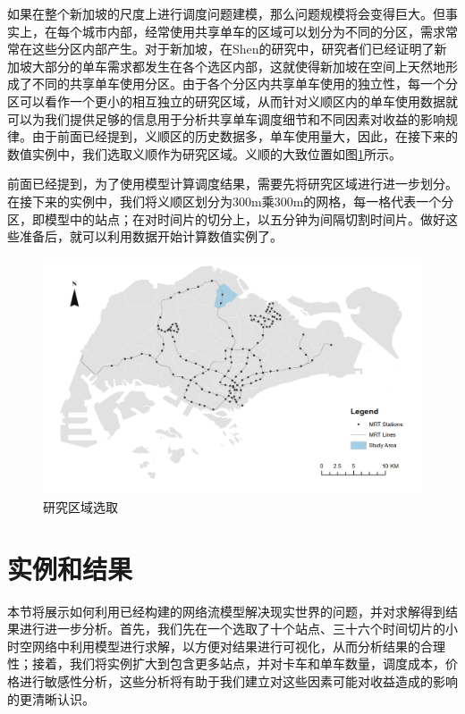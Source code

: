 \documentclass[]{tongjithesis}
\numberwithin{equation}{chapter}
\begin{document}
如果在整个新加坡的尺度上进行调度问题建模，那么问题规模将会变得巨大。但事实上，在每个城市内部，经常使用共享单车的区域可以划分为不同的分区，需求常常在这些分区内部产生。对于新加坡，在Shen\cite{shen2018mobility}的研究中，研究者们已经证明了新加坡大部分的单车需求都发生在各个选区内部，这就使得新加坡在空间上天然地形成了不同的共享单车使用分区。由于各个分区内共享单车使用的独立性，每一个分区可以看作一个更小的相互独立的研究区域，从而针对义顺区内的单车使用数据就可以为我们提供足够的信息用于分析共享单车调度细节和不同因素对收益的影响规律。由于前面已经提到，义顺区的历史数据多，单车使用量大，因此，在接下来的数值实例中，我们选取义顺作为研究区域。义顺的大致位置如图\ref{yishun}所示。

前面已经提到，为了使用模型计算调度结果，需要先将研究区域进行进一步划分。在接下来的实例中，我们将义顺区划分为300m乘300m的网格，每一格代表一个分区，即模型中的站点；在对时间片的切分上，以五分钟为间隔切割时间片。做好这些准备后，就可以利用数据开始计算数值实例了。

\begin{figure}[H]
	\centering
	\includegraphics[width= 0.9 \textwidth]{figures_main/location_yishun.png}
	\caption{研究区域选取}
	\label{yishun}
\end{figure}

\section{实例和结果}
本节将展示如何利用已经构建的网络流模型解决现实世界的问题，并对求解得到结果进行进一步分析。首先，我们先在一个选取了十个站点、三十六个时间切片的小时空网络中利用模型进行求解，以方便对结果进行可视化，从而分析结果的合理性；接着，我们将实例扩大到包含更多站点，并对卡车和单车数量，调度成本，价格进行敏感性分析，这些分析将有助于我们建立对这些因素可能对收益造成的影响的更清晰认识。
\end{document}
